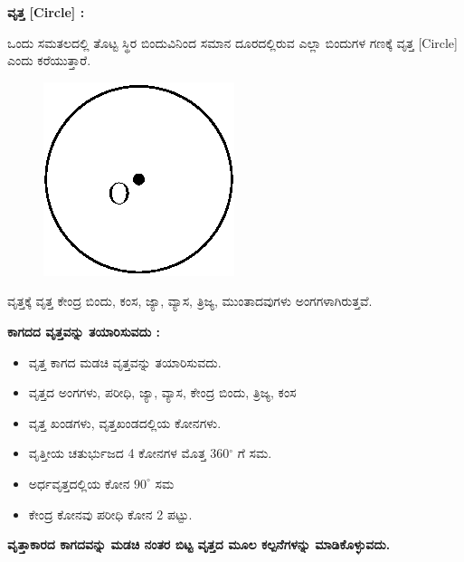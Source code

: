  \medskip
 \noindent
 \textbf{ವೃತ್ತ  [Circle] :}

ಒಂದು ಸಮತಲದಲ್ಲಿ ತೊಟ್ಟ ಸ್ಥಿರ ಬಿಂದುವಿನಿಂದ ಸಮಾನ ದೂರದಲ್ಲಿರುವ ಎಲ್ಲಾ ಬಿಂದುಗಳ ಗಣಕ್ಕೆ ವೃತ್ತ [Circle] ಎಂದು ಕರೆಯುತ್ತಾರೆ. 
\begin{figure}[H]
\centering
\includegraphics[scale=.98]{src/figure/chap1/fig1-23.eps}
\end{figure}
 
 ವೃತ್ತಕ್ಕೆ ವೃತ್ತ ಕೇಂದ್ರ ಬಿಂದು, ಕಂಸ, ಜ್ಯಾ, ವ್ಯಾಸ, ತ್ರಿಜ್ಯ, ಮುಂತಾದವುಗಳು ಅಂಗಗಳಾಗಿರುತ್ತವೆ. 
 
 \medskip
  \noindent
  \textbf{ಕಾಗದದ ವೃತ್ತವನ್ನು ತಯಾರಿಸುವದು :}
 
 \begin{itemize}
 \item ವೃತ್ತ ಕಾಗದ ಮಡಚಿ ವೃತ್ತವನ್ನು ತಯಾರಿಸುವದು. 
 \item  ವೃತ್ತದ ಅಂಗಗಳು, ಪರೀಧಿ, ಜ್ಯಾ, ವ್ಯಾಸ, ಕೇಂದ್ರ ಬಿಂದು, ತ್ರಿಜ್ಯ, ಕಂಸ 
 \item ವೃತ್ತ ಖಂಡಗಳು, ವೃತ್ತಖಂಡದಲ್ಲಿಯ ಕೋನಗಳು. 
 \item ವೃತ್ತೀಯ ಚತುರ್ಭುಜದ 4 ಕೋನಗಳ ಮೊತ್ತ 360$^\circ$ ಗೆ ಸಮ. 
 \item ಅರ್ಧವೃತ್ತದಲ್ಲಿಯ ಕೋನ $90^\circ$ ಸಮ 
 \item ಕೇಂದ್ರ ಕೋನವು ಪರೀಧಿ ಕೋನ 2 ಪಟ್ಟು. 
  \end{itemize}

\eject

\noindent
\textbf{ವೃತ್ತಾಕಾರದ ಕಾಗದವನ್ನು ಮಡಚಿ ನಂತರ ಬಿಟ್ಟ ವೃತ್ತದ ಮೂಲ ಕಲ್ಪನೆಗಳನ್ನು ಮಾಡಿಕೊಳ್ಳುವದು.}


